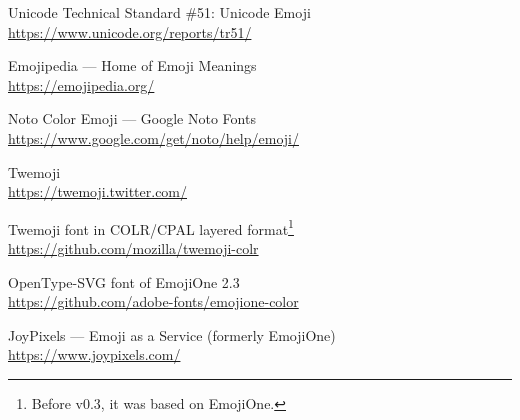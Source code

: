 \documentclass{l3doc}
\newcounter { emoji }
\begin{document}
\begin{thebibliography}{9}
  \def\newblock{\\}
  \small

  Unicode\textregistered{} Technical Standard \#51: Unicode Emoji
  \newblock \url{https://www.unicode.org/reports/tr51/}

   Emojipedia ---  Home of Emoji Meanings
  \newblock \url{https://emojipedia.org/}

  Noto Color Emoji --- Google Noto Fonts
  \newblock \url{https://www.google.com/get/noto/help/emoji/}

  Twemoji
  \newblock \url{https://twemoji.twitter.com/}

  Twemoji font in COLR/CPAL layered format\footnote{Before v0.3, it was based on EmojiOne.}
  \newblock \url{https://github.com/mozilla/twemoji-colr}

  OpenType-SVG font of EmojiOne 2.3
  \newblock \url{https://github.com/adobe-fonts/emojione-color}

  JoyPixels\texttrademark{} --- Emoji as a Service (formerly EmojiOne)
  \newblock \url{https://www.joypixels.com/}
\end{thebibliography}
\end{document}
